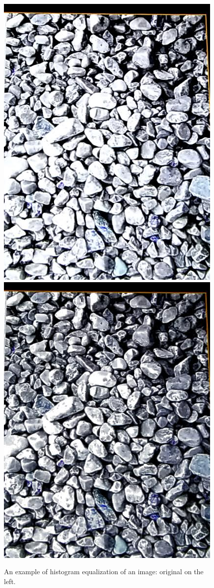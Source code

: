 \documentclass[11pt, letterpaper]{article}
\begin{document}
\begin{figure}[hbtp]
\centering
\includegraphics[scale=0.2]{img/histeq1.jpg}
\includegraphics[scale=0.2]{img/histeq2.jpg}
\caption{An example of histogram equalization of an image: original on the left.}
\label{fig:histogram}
\end{figure}
\end{document}

